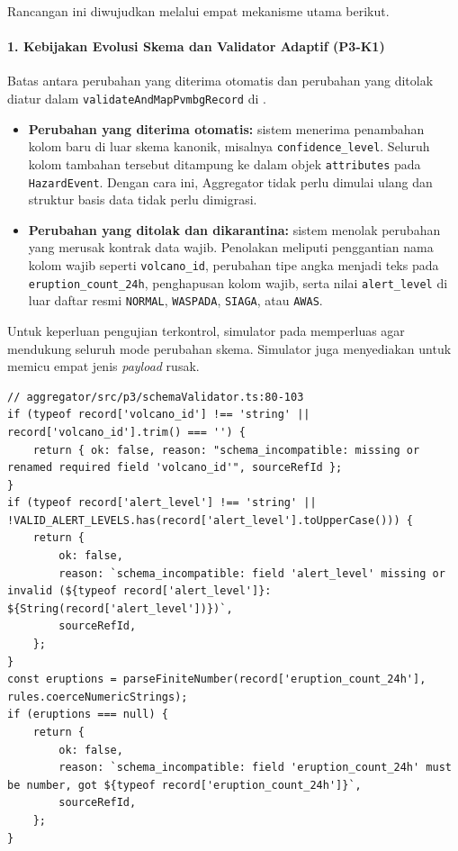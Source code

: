Rancangan ini diwujudkan melalui empat mekanisme utama berikut.

\paragraph*{1. Kebijakan Evolusi Skema dan Validator Adaptif (P3-K1)}
Batas antara perubahan yang diterima otomatis dan perubahan yang ditolak diatur dalam \texttt{validateAndMapPvmbgRecord} di .

\begin{itemize}
  \item \textbf{Perubahan yang diterima otomatis:} sistem menerima penambahan kolom baru di luar skema kanonik, misalnya \texttt{confidence\_level}. Seluruh kolom tambahan tersebut ditampung ke dalam objek \texttt{attributes} pada \texttt{HazardEvent}. Dengan cara ini, Aggregator tidak perlu dimulai ulang dan struktur basis data tidak perlu dimigrasi.
  \item \textbf{Perubahan yang ditolak dan dikarantina:} sistem menolak perubahan yang merusak kontrak data wajib. Penolakan meliputi penggantian nama kolom wajib seperti \texttt{volcano\_id}, perubahan tipe angka menjadi teks pada \texttt{eruption\_count\_24h}, penghapusan kolom wajib, serta nilai \texttt{alert\_level} di luar daftar resmi \texttt{NORMAL}, \texttt{WASPADA}, \texttt{SIAGA}, atau \texttt{AWAS}.
\end{itemize}

Untuk keperluan pengujian terkontrol, simulator pada  memperluas  agar mendukung seluruh mode perubahan skema. Simulator juga menyediakan  untuk memicu empat jenis \textit{payload} rusak.

\begin{lstlisting}
// aggregator/src/p3/schemaValidator.ts:80-103
if (typeof record['volcano_id'] !== 'string' || record['volcano_id'].trim() === '') {
    return { ok: false, reason: "schema_incompatible: missing or renamed required field 'volcano_id'", sourceRefId };
}
if (typeof record['alert_level'] !== 'string' || !VALID_ALERT_LEVELS.has(record['alert_level'].toUpperCase())) {
    return {
        ok: false,
        reason: `schema_incompatible: field 'alert_level' missing or invalid (${typeof record['alert_level']}: ${String(record['alert_level'])})`,
        sourceRefId,
    };
}
const eruptions = parseFiniteNumber(record['eruption_count_24h'], rules.coerceNumericStrings);
if (eruptions === null) {
    return {
        ok: false,
        reason: `schema_incompatible: field 'eruption_count_24h' must be number, got ${typeof record['eruption_count_24h']}`,
        sourceRefId,
    };
}
\end{lstlisting}

